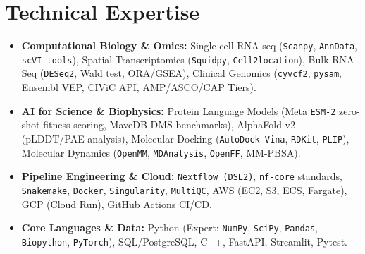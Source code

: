 \documentclass[10pt,letterpaper]{article}
\begin{document}
\section{Technical Expertise}
\vspace{2pt}
\begin{itemize}[leftmargin=*, nosep]
    \item \textbf{Computational Biology \& Omics:} Single-cell RNA-seq (\texttt{Scanpy}, \texttt{AnnData}, \texttt{scVI-tools}), Spatial Transcriptomics (\texttt{Squidpy}, \texttt{Cell2location}), Bulk RNA-Seq (\texttt{DESeq2}, Wald test, ORA/GSEA), Clinical Genomics (\texttt{cyvcf2}, \texttt{pysam}, Ensembl VEP, CIViC API, AMP/ASCO/CAP Tiers).
    \item \textbf{AI for Science \& Biophysics:} Protein Language Models (Meta \texttt{ESM-2} zero-shot fitness scoring, MaveDB DMS benchmarks), AlphaFold v2 (pLDDT/PAE analysis), Molecular Docking (\texttt{AutoDock Vina}, \texttt{RDKit}, \texttt{PLIP}), Molecular Dynamics (\texttt{OpenMM}, \texttt{MDAnalysis}, \texttt{OpenFF}, MM-PBSA).
    \item \textbf{Pipeline Engineering \& Cloud:} \texttt{Nextflow (DSL2)}, \texttt{nf-core} standards, \texttt{Snakemake}, \texttt{Docker}, \texttt{Singularity}, \texttt{MultiQC}, AWS (EC2, S3, ECS, Fargate), GCP (Cloud Run), GitHub Actions CI/CD.
    \item \textbf{Core Languages \& Data:} Python (Expert: \texttt{NumPy}, \texttt{SciPy}, \texttt{Pandas}, \texttt{Biopython}, \texttt{PyTorch}), SQL/PostgreSQL, C++, FastAPI, Streamlit, Pytest.
\end{itemize}
\vspace{-4pt}

\end{document}
